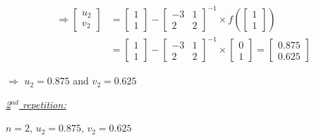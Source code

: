 \documentclass[a4paper,11pt]{article}
\begin{document}
\[ \begin{array}{ll}
    \Rightarrow  \begin{bmatrix} u_{2} \\ v_{2} \end{bmatrix} &= \begin{bmatrix} 1 \\ 1  \end{bmatrix} - \begin{bmatrix} -3 & 1  \\ 2 & 2  \end{bmatrix}^{-1} \times f\left(\begin{bmatrix} 1 \\ 1 \end{bmatrix}\right) \\
    &= \begin{bmatrix} 1 \\ 1  \end{bmatrix} - \begin{bmatrix} -3 & 1  \\ 2 & 2  \end{bmatrix}^{-1} \times \begin{bmatrix} 0 \\ 1 \end{bmatrix} = \begin{bmatrix} 0.875 \\ 0.625 \end{bmatrix} 
\end{array} \]

$\Rightarrow$ $u_2 = 0.875$  and $v_2 = 0.625$

\underline{\textit{2$^{nd}$ repetition:}}

$n = 2$, $u_2 = 0.875$, $v_2 = 0.625$
\end{document}
